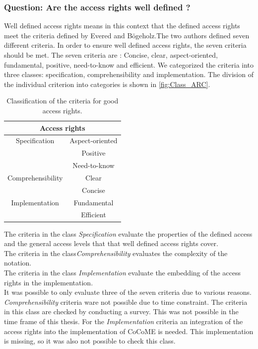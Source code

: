 \subsubsection{Question: Are the access rights well defined ?}
Well defined access rights means in this context that the defined access rights meet the criteria defined by Evered and Bögeholz\cite{CaseStudyAndAccessrigths}.The two authors defined seven different criteria. In order to ensure well defined access rights, the seven criteria should be met. The seven criteria are : Concise, clear, aspect-oriented, fundamental, positive, need-to-know and efficient. We categorized the criteria into three classes: specification, comprehensibility and implementation. The division of the individual criterion into categories is shown in \autoref{fig:Class_ARC}.
\begin{table}
\centering
\begin{tabular}{|c|c|}
\hline 
\multicolumn{2}{|c|}{Access rights} \\ 
\hline 
Specification & Aspect-oriented  \\ 
\hline 
 & Positive  \\ 
\hline 
 & Need-to-know \\ 
\hline 
Comprehensibility & Clear \\ 
\hline 
 & Concise  \\ 
\hline 
Implementation & Fundamental \\ 
\hline 
 & Efficient \\ 
\hline 
\end{tabular} 
\caption{Classification of the criteria for good access rights.}
\label{fig:Class_ARC}
\end{table}
The criteria in the class \textit{Specification} evaluate the properties of the defined access and the general access levels that that well defined access rights cover.\\
The criteria in the class\textit{Comprehensibility} evaluates the complexity of the notation.\\
The criteria in the class \textit{Implementation} evaluate the embedding of the access rights in the implementation.\\
It was possible to only evaluate three of the seven criteria due to various reasons. \textit{Comprehensibility} criteria ware not possible due to time constraint. The criteria in this class are checked by conducting a survey. This was not possible in the time frame of this thesis. For the \textit{Implementation} criteria an integration of the access rights into the implementation of CoCoME is needed. This implementation is missing, so it was also not possible to check this class.\\
